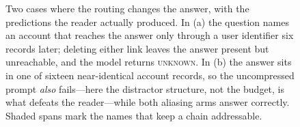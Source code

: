 \begin{figure}[t]
\vspace{7pt}

\caption{Two cases where the routing changes the answer, with the predictions the reader
actually produced. In (a) the question names an account that reaches the answer only through
a user identifier six records later; deleting either link leaves the answer present but
unreachable, and the model returns \textsc{unknown}. In (b) the answer sits in one of sixteen
near-identical account records, so the uncompressed prompt \emph{also} fails---here the
distractor structure, not the budget, is what defeats the reader---while both aliasing arms
answer correctly. Shaded spans mark the names that keep a chain addressable.}
\label{fig:cases}
\end{figure}

